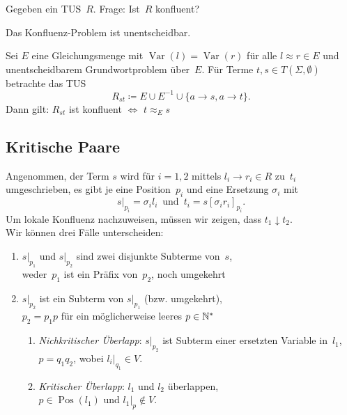 \documentclass{cheat-sheet}
\newcommand{\joinable}{\downarrow}
\DeclareMathOperator{\Pos}{Pos} %
\DeclareMathOperator{\Var}{Var} %
\newcommand{\ident}{\approx} %
\begin{document}

\begin{problem}
  Gegeben ein TUS~$R$.
  Frage: Ist~$R$ konfluent?
\end{problem}

\begin{satz}
  Das Konfluenz-Problem ist unentscheidbar.
\end{satz}

\begin{beweisskizze}
  Sei $E$ eine Gleichungsmenge mit $\Var(l) = \Var(r)$ für alle $l \ident r \in E$ und unentscheidbarem Grundwortproblem über~$E$.
  Für Terme $t, s \in T(\Sigma, \emptyset)$ betrachte das TUS
  \[ R_{st} \coloneqq E \cup E^{-1} \cup \{ a \to s, a \to t \}. \]
  Dann gilt: $R_{st}$ ist konfluent $\iff$ $t \ident_E s$
\end{beweisskizze}

\subsection{Kritische Paare}

\begin{situation}
  Angenommen, der Term $s$ wird für $i = 1, 2$ mittels $l_i \to r_i \in R$ zu~$t_i$ umgeschrieben, \dh{} es gibt je eine Position~$p_i$ und eine Ersetzung $\sigma_i$ mit
  \[
    s|_{p_i} = \sigma_i l_i
    \enspace \text{und} \enspace
    t_i = s [\sigma_i r_i]_{p_i}.
  \]
  Um lokale Konfluenz nachzuweisen, müssen wir zeigen, dass $t_1 \joinable t_2$. \\
  Wir können drei Fälle unterscheiden:
  \begin{enumerate}
    \item
      $s|_{p_1}$ und $s|_{p_2}$ sind zwei disjunkte Subterme von~$s$, \\
      \dh{} weder~$p_1$ ist ein Präfix von~$p_2$, noch umgekehrt
    \item
      $s|_{p_2}$ ist ein Subterm von $s|_{p_1}$ (bzw. umgekehrt), \\
      \dh{} $p_2 = p_1 p$ für ein möglicherweise leeres $p \in \mathbb{N}^*$
      \begin{enumerate}
        \item
          \emph{Nichkritischer Überlapp}:
          $s|_{p_2}$ ist Subterm einer ersetzten Variable in~$l_1$,
          \dh{} $p = q_1 q_2$, wobei $l_i|_{q_1} \in V$.
        \item
          \emph{Kritischer Überlapp}:
          $l_1$ und $l_2$ überlappen, \\
          \dh{} $p \in \Pos(l_1)$ und $l_1|_p \not\in V$.
      \end{enumerate}
  \end{enumerate}
\end{situation}
\end{document}
